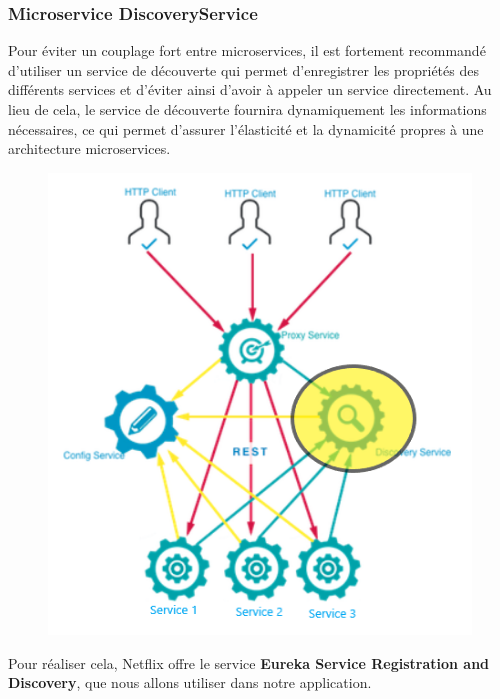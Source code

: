     \subsubsection{Microservice DiscoveryService}
Pour éviter un couplage fort entre microservices, il est fortement recommandé d'utiliser un service de découverte qui permet d'enregistrer les propriétés des différents services et d'éviter ainsi d'avoir à appeler un service directement. Au lieu de cela, le service de découverte fournira dynamiquement les informations nécessaires, ce qui permet d'assurer l'élasticité et la dynamicité propres à une architecture microservices.
\begin{figure}[H]
	\centering
	\includegraphics[width=0.5\linewidth]{images/tp04}
	\caption{}
	\label{fig:tp04}
\end{figure}
    
    Pour réaliser cela, Netflix offre le service \textbf{Eureka Service Registration and Discovery}, que nous allons utiliser dans notre application.
    

